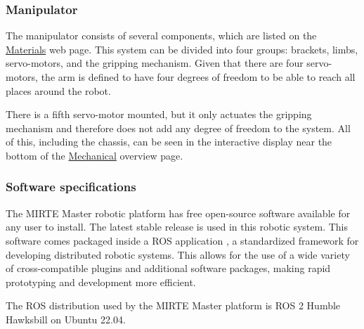     \subsubsection{Manipulator}
    
    The manipulator consists of several components, which are listed on the \href{https://matt-rbt.github.io/Lab-Cleanup-Robot-using-the-Mirte-Master-Platform/materials/}{Materials} web page. This system can be divided into four groups: brackets, limbs, servo-motors, and the gripping mechanism. Given that there are four servo-motors, the arm is defined to have four degrees of freedom to be able to reach all places around the robot.

    There is a fifth servo-motor mounted, but it only actuates the gripping mechanism and therefore does not add any degree of freedom to the system. All of this, including the chassis, can be seen in the interactive display near the bottom of the \href{https://matt-rbt.github.io/Lab-Cleanup-Robot-using-the-Mirte-Master-Platform/mechanical}{Mechanical} overview page.
    
    \subsubsection{Software specifications}

    The MIRTE Master robotic platform has free open-source software available for any user to install. \newline
    The latest stable release is used in this robotic system. This software comes packaged inside a ROS application \cite{ROS2_2022}, a standardized framework for developing distributed robotic systems. This allows for the use of a wide variety of cross-compatible plugins and additional software packages, making rapid prototyping and development more efficient.
    
    The ROS distribution used by the MIRTE Master platform is ROS 2 Humble Hawksbill on Ubuntu 22.04.
    

